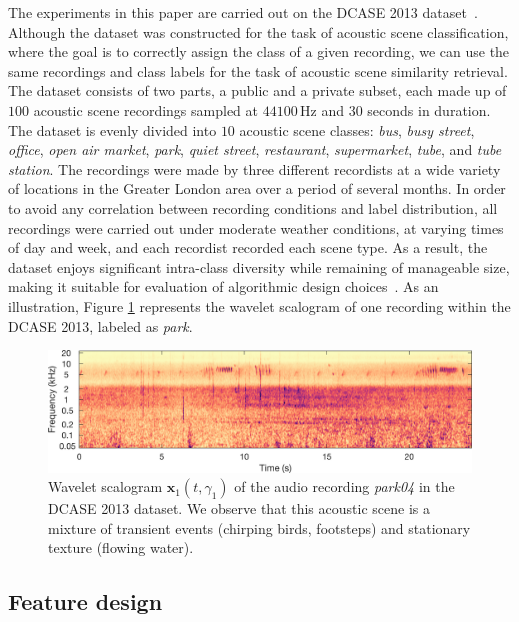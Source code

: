 \documentclass[smallextended]{svjour3}
\begin{document}
The experiments in this paper are carried out on the DCASE 2013 dataset~\cite{7100934}.
Although the dataset was constructed for the task of acoustic scene classification, where the goal is to correctly assign the class of a given recording, we can use the same recordings and class labels for the task of acoustic scene similarity retrieval.
The dataset consists of two parts, a public and a private subset, each made up of $100$ acoustic scene recordings sampled at $44100\,\mathrm{Hz}$ and $30$ seconds in duration. The dataset is evenly divided into $10$ acoustic scene classes: \emph{bus}, \emph{busy street}, \emph{office}, \emph{open air market}, \emph{park}, \emph{quiet street}, \emph{restaurant}, \emph{supermarket}, \emph{tube}, and \emph{tube station}.
The recordings were made by three different recordists at a wide variety of locations in the Greater London area over a period of several months.
In order to avoid any correlation between recording conditions and label distribution, all recordings were carried out under moderate weather conditions, at varying times of day and week, and each recordist recorded each scene type. As a result, the dataset enjoys significant intra-class diversity while remaining of manageable size, making it suitable for evaluation of algorithmic design choices~\cite{lagrange:hal-01082501}.
As an illustration, Figure \ref{fig:scalogram} represents the wavelet scalogram of one recording within the DCASE 2013, labeled as \emph{park}.


\begin{figure}
\begin{center}
\includegraphics[width=\columnwidth]{figures/park_scalogram.png}
\caption{
\label{fig:scalogram}
Wavelet scalogram $\boldsymbol{x}_1(t,\gamma_1)$ of the audio recording \emph{park04} in the DCASE 2013 dataset. We observe that this acoustic scene is a mixture of transient events (chirping birds, footsteps) and stationary texture (flowing water).}
\end{center}
\end{figure}


\subsection{Feature design}
\end{document}
